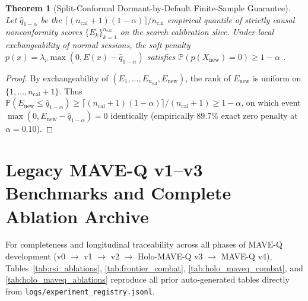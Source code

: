 \documentclass[11pt]{article}
\newtheorem{theorem}{Theorem}
\begin{document}
\begin{theorem}[Split-Conformal Dormant-by-Default Finite-Sample Guarantee]
\label{thm:conformal_dormant}
Let $\hat{q}_{1-\alpha}$ be the $\lceil (n_{\text{cal}}+1)(1-\alpha)\rceil / n_{\text{cal}}$ empirical quantile of strictly causal nonconformity scores $\{E_k\}_{k=1}^{n_{\text{cal}}}$ on the search calibration slice. Under local exchangeability of normal sessions, the soft penalty $p(x) = \lambda_v \max(0, E(x) - \hat{q}_{1-\alpha})$ satisfies $\mathbb{P}(p(X_{\text{new}}) = 0) \ge 1 - \alpha$ \citep{angelopoulos2024conformal}.
\end{theorem}
\begin{proof}
By exchangeability of $(E_1, \dots, E_{n_{\text{cal}}}, E_{\text{new}})$, the rank of $E_{\text{new}}$ is uniform on $\{1, \dots, n_{\text{cal}}+1\}$. Thus $\mathbb{P}(E_{\text{new}} \le \hat{q}_{1-\alpha}) \ge \lceil (n_{\text{cal}}+1)(1-\alpha)\rceil / (n_{\text{cal}}+1) \ge 1 - \alpha$, on which event $\max(0, E_{\text{new}} - \hat{q}_{1-\alpha}) = 0$ identically (empirically $89.7\%$ exact zero penalty at $\alpha=0.10$).
\end{proof}

\section{Legacy MAVE-Q v1--v3 Benchmarks and Complete Ablation Archive}
\label{app:legacy}
For completeness and longitudinal traceability across all phases of MAVE-Q development (v0 $\rightarrow$ v1 $\rightarrow$ v2 $\rightarrow$ Holo-MAVE-Q v3 $\rightarrow$ MAVE-Q v4), Tables~\ref{tab:rsi_ablations}, \ref{tab:frontier_combat}, \ref{tab:holo_maveq_combat}, and \ref{tab:holo_maveq_ablations} reproduce all prior auto-generated tables directly from \texttt{logs/experiment\_registry.jsonl}.





\end{document}
